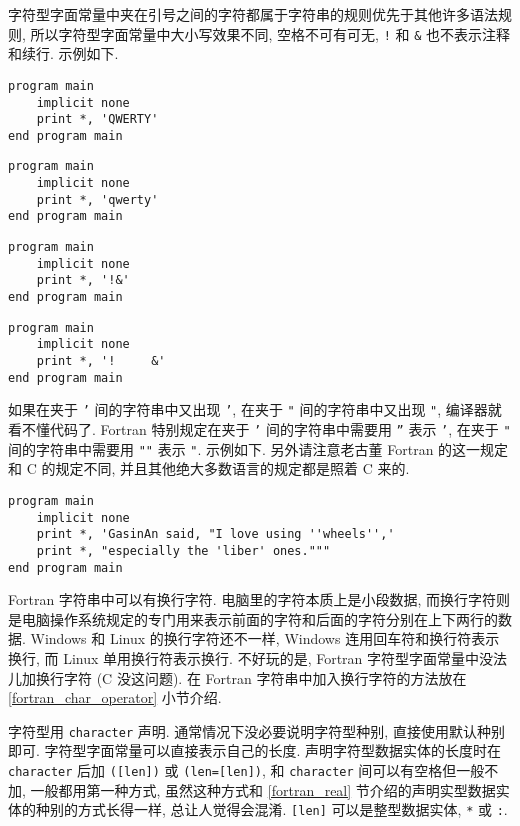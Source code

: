 字符型字面常量中夹在引号之间的字符都属于字符串的规则优先于其他许多语法规则, 所以字符型字面常量中大小写效果不同, 空格不可有可无, \texttt{!} 和 \texttt{\&{}} 也不表示注释和续行. 示例如下.
\begin{lstlisting}
program main
    implicit none
    print *, 'QWERTY'
end program main
\end{lstlisting}
\begin{lstlisting}
program main
    implicit none
    print *, 'qwerty'
end program main
\end{lstlisting}
\begin{lstlisting}
program main
    implicit none
    print *, '!&' 
end program main
\end{lstlisting}
\begin{lstlisting}
program main
    implicit none
    print *, '!     &' 
end program main
\end{lstlisting}

如果在夹于 \texttt{'} 间的字符串中又出现 \texttt{'}, 在夹于 \texttt{"} 间的字符串中又出现 \texttt{"}, 编译器就看不懂代码了. Fortran 特别规定在夹于 \texttt{'} 间的字符串中需要用 \texttt{''} 表示 \texttt{'}, 在夹于 \texttt{"} 间的字符串中需要用 \texttt{""} 表示 \texttt{"}. 示例如下. 另外请注意老古董 Fortran 的这一规定和 C 的规定不同, 并且其他绝大多数语言的规定都是照着 C 来的.
\begin{lstlisting}
program main
    implicit none
    print *, 'GasinAn said, "I love using ''wheels'','
    print *, "especially the 'liber' ones."""
end program main
\end{lstlisting}

Fortran 字符串中可以有换行字符. 电脑里的字符本质上是小段数据, 而换行字符则是电脑操作系统规定的专门用来表示前面的字符和后面的字符分别在上下两行的数据. Windows 和 Linux 的换行字符还不一样, Windows 连用回车符和换行符表示换行, 而 Linux 单用换行符表示换行. 不好玩的是, Fortran 字符型字面常量中没法儿加换行字符 (C 没这问题). 在 Fortran 字符串中加入换行字符的方法放在 \ref{fortran_char_operator} 小节介绍.

字符型用 \texttt{character} 声明. 通常情况下没必要说明字符型种别, 直接使用默认种别即可. 字符型字面常量可以直接表示自己的长度. 声明字符型数据实体的长度时在 \texttt{character} 后加 \texttt{([len])} 或 \texttt{(len=[len])}, 和 \texttt{character} 间可以有空格但一般不加, 一般都用第一种方式, 虽然这种方式和 \ref{fortran_real} 节介绍的声明实型数据实体的种别的方式长得一样, 总让人觉得会混淆. \texttt{[len]} 可以是整型数据实体, \texttt{*} 或 \texttt{:}.

